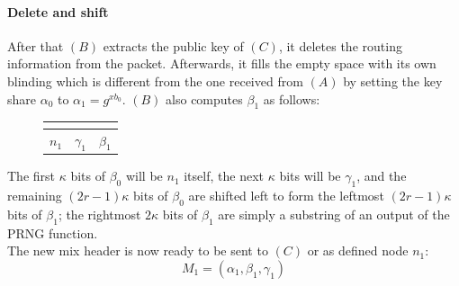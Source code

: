 \paragraph{Delete and shift}
After that $(B)$ extracts the public key of $(C)$, it deletes the routing information from the packet. Afterwards, it fills the empty space with its own blinding which is different from the one received from $(A)$ by setting the key share $\alpha_0$ to $\alpha_1=g^{xb_0}$. $(B)$ also computes $\beta_1$ as follows:
\begin{figure}[H]
    \centering

           \begin{tabular}{| m{} | m{} | m{} |}
            \hline
            \multicolumn{3}{|c|}{\centering{$\beta_0$}}\\
            \hline
            $n_{1}$ & $\gamma_{1}$& $\beta_{1}$ \\
           \hline
           \end{tabular}                   
    \end{figure}
\hspace{-5mm}The first $\kappa$ bits of $\beta_0$ will be $n_{1}$ itself, the next $\kappa$ bits will be $\gamma_{1}$, and the remaining $(2r-1)\kappa$ bits of $\beta_0$ are shifted left to form the leftmost $(2r-1)\kappa$ bits of $\beta_{1}$; the rightmost $2\kappa$ bits of $\beta_{1}$ are simply a substring of an output of the PRNG function.
\\The new mix header is now ready to be sent to $(C)$ or as defined node $n_1$: $$M_1=(\alpha_1,\beta_1,\gamma_1)$$
